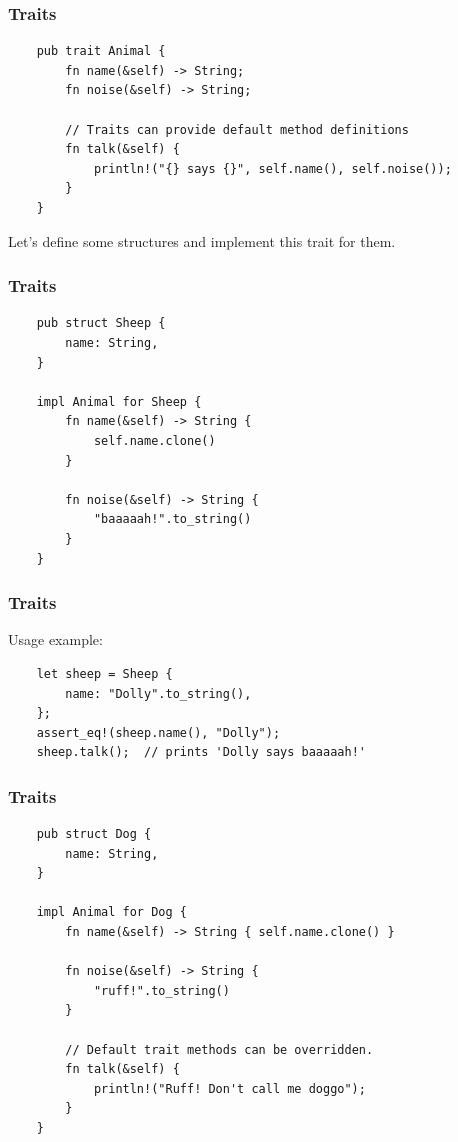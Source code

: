 \documentclass[aspectratio=1610,t]{beamer}
\begin{document}

\begin{frame}[fragile]
\frametitle{Traits}

\begin{verbatim}
    pub trait Animal {
        fn name(&self) -> String;
        fn noise(&self) -> String;

        // Traits can provide default method definitions
        fn talk(&self) {
            println!("{} says {}", self.name(), self.noise());
        }
    }
\end{verbatim}

Let's define some structures and implement this trait for them.
\end{frame}


\begin{frame}[fragile]
\frametitle{Traits}
\begin{verbatim}
    pub struct Sheep {
        name: String,
    }

    impl Animal for Sheep {
        fn name(&self) -> String {
            self.name.clone()
        }

        fn noise(&self) -> String {
            "baaaaah!".to_string()
        }
    }
\end{verbatim}
\end{frame}


\begin{frame}[fragile]
\frametitle{Traits}
Usage example:

\begin{verbatim}
    let sheep = Sheep {
        name: "Dolly".to_string(),
    };
    assert_eq!(sheep.name(), "Dolly");
    sheep.talk();  // prints 'Dolly says baaaaah!'
\end{verbatim}
\end{frame}


\begin{frame}[fragile]
\frametitle{Traits}
\begin{verbatim}
    pub struct Dog {
        name: String,
    }

    impl Animal for Dog {
        fn name(&self) -> String { self.name.clone() }

        fn noise(&self) -> String {
            "ruff!".to_string()
        }

        // Default trait methods can be overridden.
        fn talk(&self) {
            println!("Ruff! Don't call me doggo");
        }
    }
\end{verbatim}
\end{frame}
\end{document}
